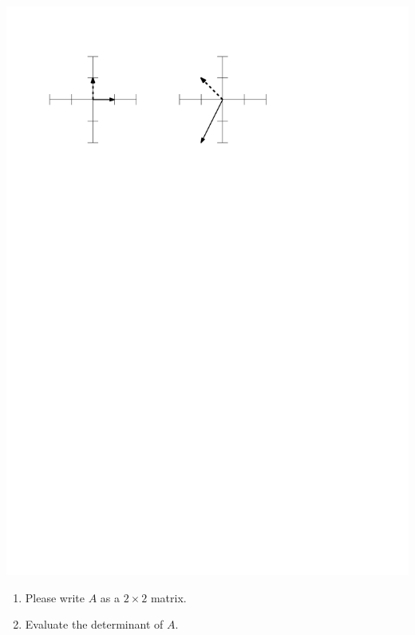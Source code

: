 \documentclass[12pt]{amsart}
\begin{document}
\begin{enumerate}
\includegraphics{q4p3.pdf}

\begin{enumerate}
\item Please write $A$ as a $2\times 2$ matrix.

\vspace{4cm}
\item Evaluate the determinant of $A$.
\end{enumerate}

\end{enumerate}
\end{document}
